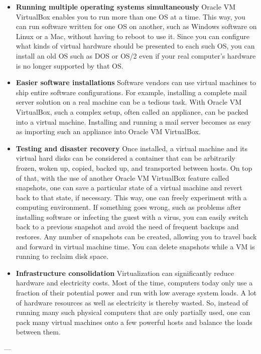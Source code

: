 \documentclass[11pt]{article}
\begin{document}
\begin{itemize}
\item \textbf{Running multiple operating systems simultaneously}
Oracle VM VirtualBox enables you to run more than one OS at a time. This way, you can run software written for one OS on another, such as Windows software on Linux or a Mac, without having to reboot to use it. Since you can configure what kinds of virtual hardware should be presented to each such OS, you can install an old OS such as DOS or OS/2 even if your real computer's hardware is no longer supported by that OS.
\item \textbf{Easier software installations} 
Software vendors can use virtual machines to ship entire software configurations. For example, installing a complete mail server solution on a real machine can be a tedious task. With Oracle VM VirtualBox, such a complex setup, often called an appliance, can be packed into a virtual machine. Installing and running a mail server becomes as easy as importing such an appliance into Oracle VM VirtualBox.
\item \textbf{Testing and disaster recovery} 
Once installed, a virtual machine and its virtual hard disks can be considered a container that can be arbitrarily frozen, woken up, copied, backed up, and transported between hosts.
On top of that, with the use of another Oracle VM VirtualBox feature called snapshots, one can save a particular state of a virtual machine and revert back to that state, if necessary. This way, one can freely experiment with a computing environment. If something goes wrong, such as problems after installing software or infecting the guest with a virus, you can easily switch back to a previous snapshot and avoid the need of frequent backups and restores.
Any number of snapshots can be created, allowing you to travel back and forward in virtual machine time. You can delete snapshots while a VM is running to reclaim disk space.
\item \textbf{Infrastructure consolidation}
Virtualization can significantly reduce hardware and electricity costs. Most of the time, computers today only use a fraction of their potential power and run with low average system loads. A lot of hardware resources as well as electricity is thereby wasted. So, instead of running many such physical computers that are only partially used, one can pack many virtual machines onto a few powerful hosts and balance the loads between them.
\end{itemize}
---
\newpage
\end{document}

